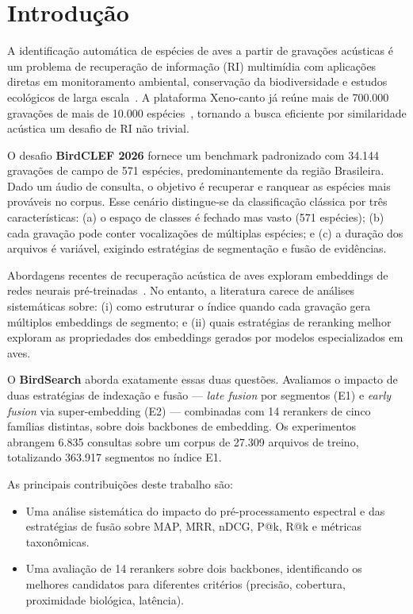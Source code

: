 \documentclass[12pt]{article}
\begin{document}
\section{Introdução}
\label{sec:intro}

A identificação automática de espécies de aves a partir de gravações acústicas
é um problema de recuperação de informação (RI) multimídia com aplicações
diretas em monitoramento ambiental, conservação da biodiversidade e estudos
ecológicos de larga escala~\cite{stowell:22}. A plataforma Xeno-canto já reúne
mais de 700.000 gravações de mais de 10.000 espécies~\cite{xeno:14}, tornando
a busca eficiente por similaridade acústica um desafio de RI não trivial.

O desafio \textbf{BirdCLEF 2026} fornece um benchmark padronizado com 34.144
gravações de campo de 571 espécies, predominantemente da região Brasileira.
Dado um áudio de consulta, o objetivo é recuperar e ranquear as espécies mais
prováveis no corpus. Esse cenário distingue-se da classificação clássica por
três características: (a) o espaço de classes é fechado mas vasto (571
espécies); (b) cada gravação pode conter vocalizações de múltiplas espécies;
e (c) a duração dos arquivos é variável, exigindo estratégias de segmentação
e fusão de evidências.

Abordagens recentes de recuperação acústica de aves exploram embeddings de
redes neurais pré-treinadas~\cite{kahl:21, merriënboer:25}. No entanto, a
literatura carece de análises sistemáticas sobre: (i) como estruturar o índice
quando cada gravação gera múltiplos embeddings de segmento; e (ii) quais
estratégias de reranking melhor exploram as propriedades dos embeddings gerados
por modelos especializados em aves.

O \textbf{BirdSearch} aborda exatamente essas duas questões. Avaliamos o
impacto de duas estratégias de indexação e fusão --- \textit{late fusion} por
segmentos (E1) e \textit{early fusion} via super-embedding (E2) --- combinadas
com 14 rerankers de cinco famílias distintas, sobre dois backbones de embedding.
Os experimentos abrangem 6.835 consultas sobre um corpus de 27.309 arquivos de
treino, totalizando 363.917 segmentos no índice E1.

As principais contribuições deste trabalho são:
\begin{itemize}
  \item Uma análise sistemática do impacto do
  pré-processamento espectral e das estratégias de fusão sobre MAP, MRR,
  nDCG, P@k, R@k e métricas taxonômicas.
  \item Uma avaliação de 14 rerankers sobre dois backbones, identificando os
  melhores candidatos para diferentes critérios (precisão, cobertura,
  proximidade biológica, latência).
\end{itemize}
\end{document}
